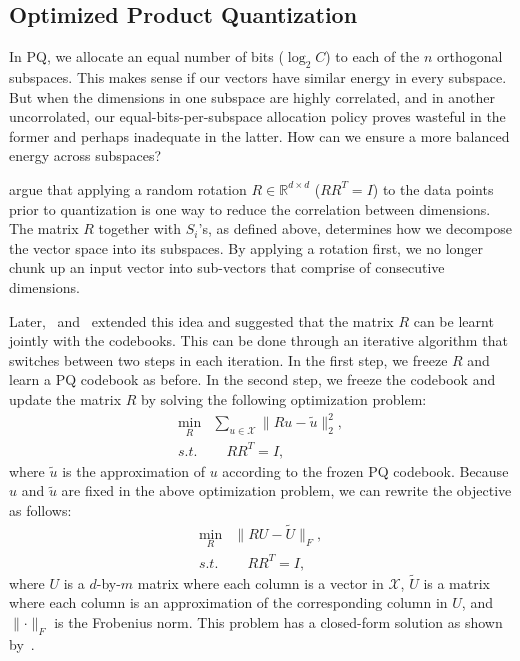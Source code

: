 \subsection{Optimized Product Quantization}
In PQ, we allocate an equal number of bits ($\log_2 C$) to each of the $n$ orthogonal subspaces.
This makes sense if our vectors have similar energy in every subspace.
But when the dimensions in one subspace are highly correlated, and in another
uncorrolated, our equal-bits-per-subspace allocation policy proves wasteful in the former
and perhaps inadequate in the latter. How can we ensure a more balanced energy across subspaces?

\cite{pq} argue that applying a random rotation $R \in \mathbb{R}^{d \times d}$ ($RR^T = I$)
to the data points prior to quantization is one way to reduce the correlation between dimensions.
The matrix $R$ together with $S_i$'s, as defined above, determines how we decompose the vector
space into its subspaces. By applying a rotation first, we no longer chunk up an input vector
into sub-vectors that comprise of consecutive dimensions.

Later,~\cite{opq} and~\cite{norouzi2013ckmeans} extended this idea and suggested that the matrix
$R$ can be learnt jointly with the codebooks. This can be done through an iterative algorithm
that switches between two steps in each iteration. In the first step, we freeze $R$ and learn
a PQ codebook as before. In the second step, we freeze the codebook and update the matrix $R$
by solving the following optimization problem:
\begin{align*}
    \min_R &\sum_{u \in \mathcal{X}} \lVert Ru - \tilde{u} \rVert_2^2, \\
    \mathit{s.t.} & \quad RR^T = I,
\end{align*}
where $\tilde{u}$ is the approximation of $u$ according to the frozen PQ codebook.
Because $u$ and $\tilde{u}$ are fixed in the above optimization problem,
we can rewrite the objective as follows:
\begin{align*}
    \min_R & \lVert RU - \tilde{U} \rVert_F, \\
    \mathit{s.t.} & \quad RR^T = I,
\end{align*}
where $U$ is a $d$-by-$m$ matrix where each column is a vector in $\mathcal{X}$,
$\tilde{U}$ is a matrix where each column is an approximation of the corresponding
column in $U$, and $\lVert \cdot \rVert_F$ is the Frobenius norm.
This problem has a closed-form solution as shown by~\cite{opq}.

